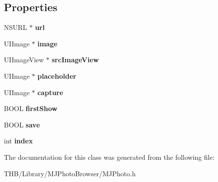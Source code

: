 \subsection*{Properties}
\begin{DoxyCompactItemize}
\item 
\mbox{\label{interface_m_j_photo_aadadc8fcaae4c1f44b528db7266cf366}} 
N\+S\+U\+RL $\ast$ {\bfseries url}
\item 
\mbox{\label{interface_m_j_photo_a689645f66b6f813aabb728119795f17d}} 
U\+I\+Image $\ast$ {\bfseries image}
\item 
\mbox{\label{interface_m_j_photo_a3a4e08b2a6c83c23644579733b25ab88}} 
U\+I\+Image\+View $\ast$ {\bfseries src\+Image\+View}
\item 
\mbox{\label{interface_m_j_photo_a3203dbb4fd93f05339c326c5dab3051d}} 
U\+I\+Image $\ast$ {\bfseries placeholder}
\item 
\mbox{\label{interface_m_j_photo_ab48c2513de5dca39e1bcf6cd158c62c8}} 
U\+I\+Image $\ast$ {\bfseries capture}
\item 
\mbox{\label{interface_m_j_photo_a9ae64fc808410c578450dbb2823b8ae3}} 
B\+O\+OL {\bfseries first\+Show}
\item 
\mbox{\label{interface_m_j_photo_ab919820ae05a3a3026d4f7874b31bdb1}} 
B\+O\+OL {\bfseries save}
\item 
\mbox{\label{interface_m_j_photo_a7fdfe038ed91918b6b3936d5e4d82e28}} 
int {\bfseries index}
\end{DoxyCompactItemize}


The documentation for this class was generated from the following file\+:\begin{DoxyCompactItemize}
\item 
T\+H\+B/\+Library/\+M\+J\+Photo\+Browser/M\+J\+Photo.\+h\end{DoxyCompactItemize}
